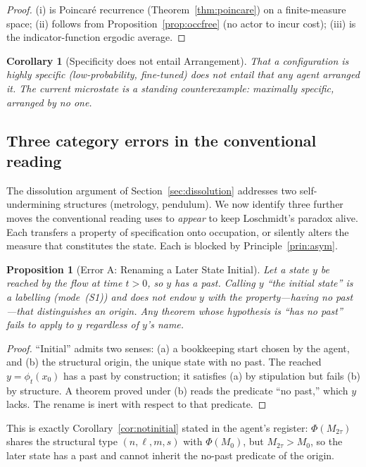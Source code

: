 \documentclass[twocolumn,10pt,a4paper]{article}
\theoremstyle{thmstyle}
\newtheorem{proposition}[theorem]{Proposition}
\newtheorem{corollary}[theorem]{Corollary}
\theoremstyle{definition}
\theoremstyle{remark}
\begin{document}
\begin{proof}
(i) is Poincar\'{e} recurrence
(Theorem~\ref{thm:poincare}) on a finite-measure space; (ii) follows
from Proposition~\ref{prop:occfree} (no actor to incur cost); (iii)
is the indicator-function ergodic average.
\end{proof}

\begin{corollary}[Specificity does not entail Arrangement]
\label{cor:specnotarr}
That a configuration is highly specific (low-probability,
fine-tuned) does not entail that any agent arranged it. The current
microstate is a standing counterexample: maximally specific, arranged
by no one.
\end{corollary}

\subsection{Three category errors in the conventional reading}

The dissolution argument of Section~\ref{sec:dissolution} addresses
two self-undermining structures (metrology, pendulum). We now
identify three further moves the conventional reading uses to
\emph{appear} to keep Loschmidt's paradox alive. Each transfers a
property of specification onto occupation, or silently alters the
measure that constitutes the state. Each is blocked by
Principle~\ref{prin:asym}.

\begin{proposition}[Error A: Renaming a Later State Initial]
\label{prop:errA}
Let a state $y$ be reached by the flow at time $t>0$, so $y$ has a
past. Calling $y$ ``the initial state'' is a labelling (mode~(S1))
and does not endow $y$ with the property---having no past---that
distinguishes an origin. Any theorem whose hypothesis is ``has no
past'' fails to apply to $y$ regardless of $y$'s name.
\end{proposition}

\begin{proof}
``Initial'' admits two senses: (a) a bookkeeping start chosen by the
agent, and (b) the structural origin, the unique state with no past.
The reached $y=\phi_{t}(x_{0})$ has a past by construction; it
satisfies (a) by stipulation but fails (b) by structure. A theorem
proved under (b) reads the predicate ``no past,'' which $y$ lacks.
The rename is inert with respect to that predicate.
\end{proof}

This is exactly Corollary~\ref{cor:notinitial} stated in the agent's
register: $\Phi(M_{2\tau})$ shares the structural type
$(n,\ell,m,s)$ with $\Phi(M_{0})$, but $M_{2\tau}>M_{0}$, so the
later state has a past and cannot inherit the no-past predicate of
the origin.
\end{document}
